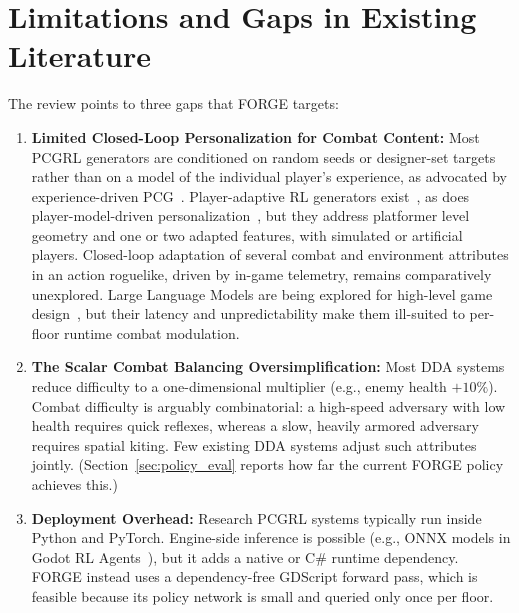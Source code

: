 \section{Limitations and Gaps in Existing Literature}
The review points to three gaps that FORGE targets:
\begin{enumerate}
    \item \textbf{Limited Closed-Loop Personalization for Combat Content:} Most PCGRL generators are conditioned on random seeds or designer-set targets~\cite{earle2021controllable, earle2024pcgrlplus} rather than on a model of the individual player's experience, as advocated by experience-driven PCG~\cite{yannakakis2011experience}. Player-adaptive RL generators exist~\cite{shu2021edrl, wang2022oparl}, as does player-model-driven personalization~\cite{shaker2010personalized}, but they address platformer level geometry and one or two adapted features, with simulated or artificial players. Closed-loop adaptation of several combat and environment attributes in an action roguelike, driven by in-game telemetry, remains comparatively unexplored. Large Language Models are being explored for high-level game design~\cite{gallotta2024llmsurvey}, but their latency and unpredictability make them ill-suited to per-floor runtime combat modulation.
    \item \textbf{The Scalar Combat Balancing Oversimplification:} Most DDA systems reduce difficulty to a one-dimensional multiplier (e.g., enemy health $+10\%$). Combat difficulty is arguably combinatorial: a high-speed adversary with low health requires quick reflexes, whereas a slow, heavily armored adversary requires spatial kiting. Few existing DDA systems adjust such attributes jointly. (Section~\ref{sec:policy_eval} reports how far the current FORGE policy achieves this.)
    \item \textbf{Deployment Overhead:} Research PCGRL systems typically run inside Python and PyTorch. Engine-side inference is possible (e.g., ONNX models in Godot RL Agents~\cite{godotrl}), but it adds a native or C\# runtime dependency. FORGE instead uses a dependency-free GDScript forward pass, which is feasible because its policy network is small and queried only once per floor.
\end{enumerate}

